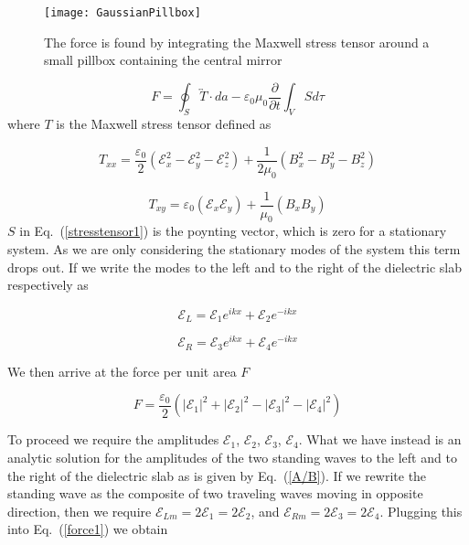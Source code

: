 \documentclass[twocolumn,english,pra,aps,superscriptaddress,floatfix]{revtex4-1}
\begin{document}
\begin{figure}
\texttt{[image: GaussianPillbox]}
\caption{The force is found by integrating the Maxwell stress tensor around a small pillbox containing the central mirror}
\label{fig:gaussianpillbox}
\end{figure}

\begin{equation}
F=\oint_{S}\overleftrightarrow{T}\cdot da-\varepsilon_{0}\mu_{0}\frac{\partial}{\partial t}\int_{V}Sd\tau
\label{stresstensor1}
\end{equation}
where $T$ is the Maxwell stress tensor defined as

\begin{equation}
T_{xx}=\frac{\varepsilon_{0}}{2}\left(\mathcal{E}_{x}^{2}-\mathcal{E}_{y}^{2}-\mathcal{E}_{z}^{2}\right)+\frac{1}{2\mu_{0}}\left(B_{x}^{2}-B_{y}^{2}-B_{z}^{2}\right)
\label{stresstensor2}
\end{equation}


\begin{equation}
T_{xy}=\varepsilon_{0}\left(\mathcal{E}_{x}\mathcal{E}_{y}\right)+\frac{1}{\mu_{0}}\left(B_{x}B_{y}\right)
\label{stresstensor3}
\end{equation}
$S$ in Eq.\ (\ref{stresstensor1}) is the poynting vector, which is zero for a stationary system.  As we are only considering the stationary modes of the system this term drops out.
If we write the modes to the left and to the right of the dielectric
slab respectively as

\begin{equation}
\mathcal{E}_{L}=\mathcal{E}_{1}e^{ikx}+\mathcal{E}_{2}e^{-ikx}
\label{Efieldleft}
\end{equation}


\begin{equation}
\mathcal{E}_{R}=\mathcal{E}_{3}e^{ikx}+\mathcal{E}_{4}e^{-ikx}
\label{EfieldRight}
\end{equation}

We then arrive at the force per unit area $F$ 

\begin{equation}
F=\frac{\varepsilon_{0}}{2}\left(\left|\mathcal{E}_{1}\right|^{2}+\left|\mathcal{E}_{2}\right|^{2}-\left|\mathcal{E}_{3}\right|^{2}-\left|\mathcal{E}_{4}\right|^{2}\right)
\label{force1}
\end{equation}

To proceed we require the amplitudes $\mathcal{E}_{1}$, $\mathcal{E}_{2}$, $\mathcal{E}_{3}$, $\mathcal{E}_{4}$. What we have instead is an analytic solution for the amplitudes
of the two standing waves to the left and to the right of the dielectric slab as is given by Eq.\ (\ref{A/B}).
If we rewrite the standing wave as the composite of two traveling waves moving in opposite direction, then we require $\mathcal{E}_{Lm}=2\mathcal{E}_{1}=2\mathcal{E}_{2}$, and $\mathcal{E}_{Rm}=2\mathcal{E}_{3}=2\mathcal{E}_{4}$.
Plugging this into Eq.\ (\ref{force1}) we obtain
\end{document}
